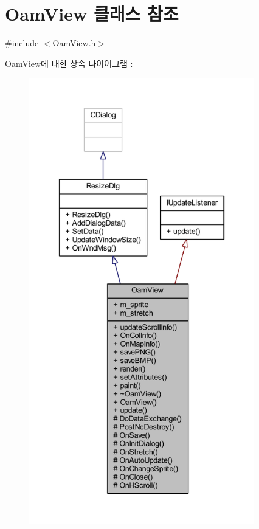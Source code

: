 \hypertarget{class_oam_view}{}\section{Oam\+View 클래스 참조}
\label{class_oam_view}


{\ttfamily \#include $<$Oam\+View.\+h$>$}



Oam\+View에 대한 상속 다이어그램 \+: \nopagebreak
\begin{figure}[H]
\begin{center}
\leavevmode
\includegraphics[height=550pt]{class_oam_view__inherit__graph}
\end{center}
\end{figure}


